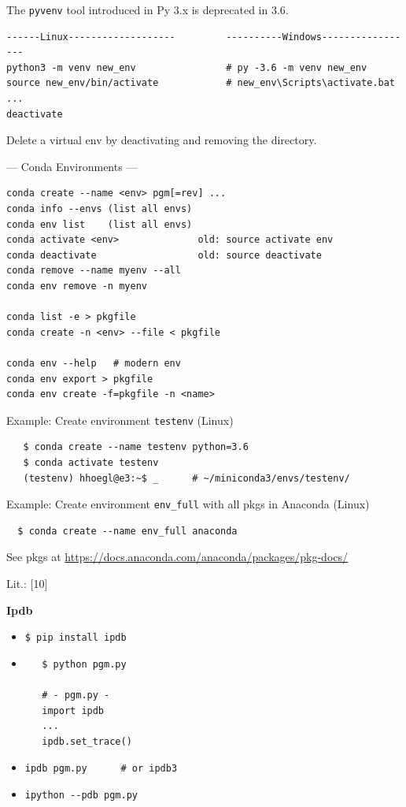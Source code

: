 \documentclass[9pt,a4wide]{extarticle}
\begin{document}
The {\tt pyvenv} tool introduced in Py 3.x is deprecated in 3.6.

\begin{verbatim}
------Linux-------------------         ----------Windows-----------------
python3 -m venv new_env                # py -3.6 -m venv new_env 
source new_env/bin/activate            # new_env\Scripts\activate.bat 
...
deactivate
\end{verbatim}

Delete a virtual env by deactivating and removing the directory.


--- Conda Environments ---

\begin{verbatim}
conda create --name <env> pgm[=rev] ...         
conda info --envs (list all envs)        
conda env list    (list all envs)
conda activate <env>              old: source activate env
conda deactivate                  old: source deactivate                         
conda remove --name myenv --all
conda env remove -n myenv

conda list -e > pkgfile
conda create -n <env> --file < pkgfile
                                         
conda env --help   # modern env
conda env export > pkgfile 
conda env create -f=pkgfile -n <name>
\end{verbatim}

Example: Create environment {\tt testenv} (Linux)

\begin{verbatim}
   $ conda create --name testenv python=3.6
   $ conda activate testenv
   (testenv) hhoegl@e3:~$ _      # ~/miniconda3/envs/testenv/
\end{verbatim}

Example: Create environment {\tt env\_full} with all pkgs in Anaconda (Linux)

\begin{verbatim}
  $ conda create --name env_full anaconda
\end{verbatim}

See pkgs at \url{https://docs.anaconda.com/anaconda/packages/pkg-docs/}



Lit.: [10]


\medskip
{\bf Ipdb}
{}

\begin{itemize}
\item {\tt \$ pip install ipdb}

\item 
   \begin{verbatim}
   $ python pgm.py

   # - pgm.py -
   import ipdb
   ...
   ipdb.set_trace()
   \end{verbatim}

\item {\tt ipdb pgm.py \ \ \ \ \  \# or ipdb3}

\item {\tt ipython -{}-pdb pgm.py}

\end{itemize}
\end{document}
